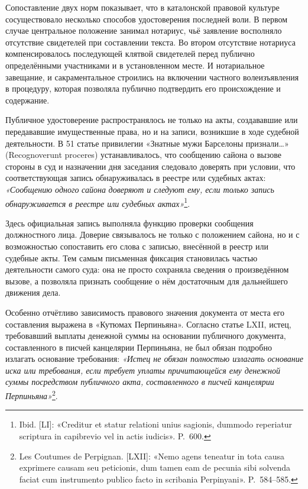 Сопоставление двух норм показывает, что в каталонской правовой культуре сосуществовало несколько способов удостоверения последней воли. В первом случае центральное положение занимал нотариус, чьё заявление восполняло отсутствие свидетелей при составлении текста. Во втором отсутствие нотариуса компенсировалось последующей клятвой свидетелей перед публично определёнными участниками и в установленном месте. И нотариальное завещание, и сакраментальное строились на включении частного волеизъявления в процедуру, которая позволяла публично подтвердить его происхождение и содержание.

Публичное удостоверение распространялось не только на акты, создававшие или передававшие имущественные права, но и на записи, возникшие в ходе судебной деятельности. В 51 статье привилегии «Знатные мужи Барселоны признали…» (Recognoverunt proceres) устанавливалось, что сообщению сайона о вызове стороны в суд и назначении дня заседания следовало доверять при условии, что соответствующая запись обнаруживалась в реестре или судебных актах: \emph{«Сообщению одного }\emph{сайона}\emph{ доверяют и следуют ему, если только запись обнаруживается в реестре или судебных актах»}\footnote{Ibid. [LI]: «Creditur et statur relationi unius sagionis, dummodo reperiatur scriptura in capibrevio vel in actis iudicis». P.~600.}.

Здесь официальная запись выполняла функцию проверки сообщения должностного лица. Доверие связывалось не только с положением сайона, но и с возможностью сопоставить его слова с записью, внесённой в реестр или судебные акты. Тем самым письменная фиксация становилась частью деятельности самого суда: она не просто сохраняла сведения о произведённом вызове, а позволяла признать сообщение о нём достаточным для дальнейшего движения дела.

Особенно отчётливо зависимость правового значения документа от места его составления выражена в «Кутюмах Перпиньяна». Согласно статье LXII, истец, требовавший выплаты денежной суммы на основании публичного документа, составленного в писчей канцелярии Перпиньяна, не был обязан подробно излагать основание требования: \emph{«Истец не обязан полностью излагать основание иска или требования, если требует уплаты причитающейся ему денежной суммы посредством публичного акта, составленного в писчей канцелярии Перпиньяна»}\footnote{Les Coutumes de Perpignan. [LXII]: «Nemo agens teneatur in tota causa exprimere causam seu peticionis, dum tamen eam de pecunia sibi solvenda faciat cum instrumento publico facto in scribania Perpinyani». P.~584--585.}.

